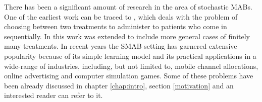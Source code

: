 There has been a significant amount of research in the area of stochastic MABs. One of the earliest work can be traced to \citet{thompson1933likelihood}, which deals with the problem of choosing between two treatments to administer to patients who come in sequentially. In \citet{thompson1935theory} this work was extended to include more general cases of finitely many treatments. In recent years the SMAB setting has garnered extensive popularity because of its simple learning model and its practical applications in a wide-range of industries, including, but not limited to, mobile channel allocations, online advertising and computer simulation games. Some of these problems have been already discussed in chapter \ref{chap:intro}, section \ref{motivation} and an interested reader can refer to it.
    